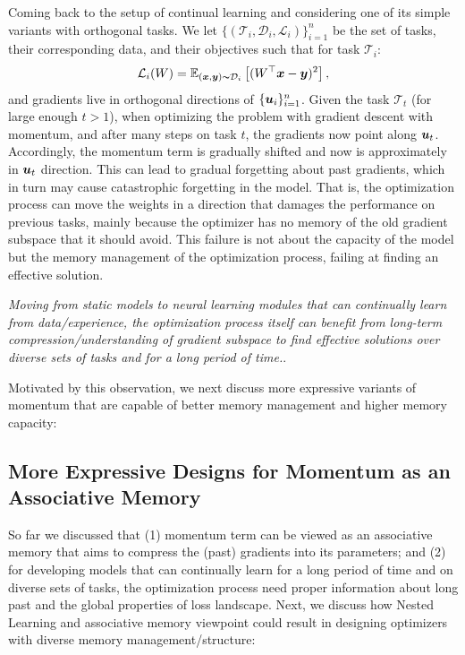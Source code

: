Coming back to the setup of continual learning and considering one of its simple variants with orthogonal tasks. We let $\{(\mathcal{T}_i, \mathcal{D}_i, \mathcal{L}_{i})\}_{i = 1}^{n}$ be the set of tasks, their corresponding data, and their objectives such that for task $\mathcal{T}_i$:
\begin{align}
    \mathcal{L}_i(W) = \mathbb{E}_{(\boldsymbol{x}, \boldsymbol{y})\thicksim \mathcal{D}_{i}}\left[ (W^{\top} \boldsymbol{x} - \boldsymbol{y})^2 \right],
\end{align}
and gradients live in orthogonal directions of $\{\boldsymbol{u}_i\}_{i = 1}^{n}$. Given the task $\mathcal{T}_t$ (for large enough $t > 1$), when optimizing the problem with gradient descent with momentum, and after many steps on task $t$, the gradients now point along $\boldsymbol{u}_t$. Accordingly, the momentum term is gradually shifted and now is approximately in $\boldsymbol{u}_t$ direction. This can lead to gradual forgetting about past gradients, which in turn may cause catastrophic forgetting in the model. That is, the optimization process can move the weights in a direction that damages the performance on previous tasks, mainly because the optimizer has no memory of the old gradient subspace that it should avoid. This failure is not about the capacity of the model but the memory management of the optimization process, failing at finding an effective solution. 

\begin{myboxi}
    \textit{Moving from static models to neural learning modules that can continually learn from data/experience, the optimization process itself can benefit from long-term compression/understanding of gradient subspace to find effective solutions over diverse sets of tasks and for a long period of time.}.
\end{myboxi}


Motivated by  this observation, we next discuss more expressive variants of momentum that are capable of better memory management and higher memory capacity:


\subsection{More Expressive Designs for Momentum as an Associative Memory}\label{sec:more-expressive-momentum}
So far we discussed that (1) momentum term can be viewed as an associative memory that aims to compress the (past) gradients into its parameters; and (2) for developing models that can continually learn for a long period of time and on diverse sets of tasks, the optimization process need proper information about long past and the global properties of loss landscape. Next, we discuss how  Nested Learning and associative memory viewpoint could result in designing optimizers with diverse memory management/structure:

